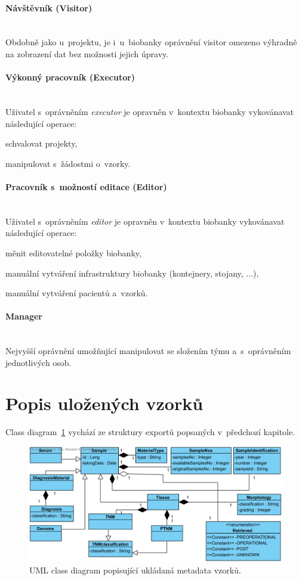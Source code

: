 \documentclass[11pt, draft, oneside]{fithesis2}
\newcommand{\paragraphNewLine}[1]{\paragraph*{#1}\mbox{}\\}
\begin{document}
\paragraphNewLine{Návštěvník (Visitor)} 
Obdobně jako u~projektu, je i~u~biobanky oprávnění visitor omezeno výhradně na zobrazení dat bez možnosti jejich úpravy. 

\paragraphNewLine{Výkonný pracovník (Executor)}
Uživatel s~oprávněním \textit{executor} je opravněn v~kontextu biobanky vykovánavat následující operace:
\begin{compactitem}
	\item schvalovat projekty,
	\item manipulovat s~žádostmi o~vzorky.
\end{compactitem}

\paragraphNewLine{Pracovník s~možností editace (Editor)} 
Uživatel s~oprávněním \textit{editor} je opravněn v~kontextu biobanky vykovánavat následující operace:
\begin{compactitem}
	\item měnit editovatelné položky biobanky,
	\item manuální vytváření infrastruktury biobanky (kontejnery, stojany, ...),
	\item manuální vytváření pacientů a~vzorků.
\end{compactitem}

\paragraphNewLine{Manager}
Nejvyšší oprávnění umožňující manipulovat se složením týmu a~s~oprávněním jednotlivých osob.

\section{Popis uložených vzorků}
Class diagram~\ref{fig:index:uml:class:sample} vychází ze struktury exportů popsaných v~předchozí kapitole.

\begin{figure}[h!]
\begin{center}
	\includegraphics[width=\textwidth]{SampleView}
\caption{UML class diagram popisující ukládaná metadata vzorků.}
\label{fig:index:uml:class:sample}
\end{center}
\end{figure}
\end{document}
